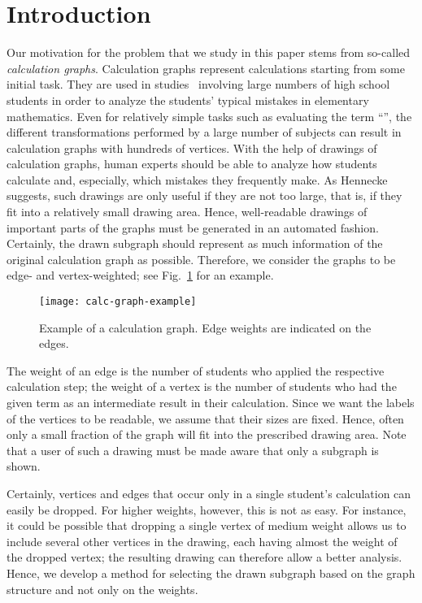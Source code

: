 \documentclass[]{llncs}
\begin{document}
\section{Introduction}
Our motivation for the problem that we study in this paper stems from
so-called \emph{calculation graphs}.  Calculation graphs
represent calculations starting from some initial task.  They
are used in studies~\cite{hennecke07} involving large numbers of high school
students in order to analyze the students' typical mistakes in elementary
mathematics. Even for relatively simple tasks such as evaluating the
term ``'', the different transformations
performed by a large number of subjects can result in calculation
graphs with hundreds of vertices. With the help of drawings of
calculation graphs, human experts should be able to analyze how
students calculate and, especially, which mistakes they frequently
make. As Hennecke~\cite{hennecke07} suggests, such drawings
are only useful if they are not too large, that is, if
they fit into a relatively small drawing area. Hence, well-readable
drawings of important parts of the graphs must be generated in an
automated fashion. 
Certainly, the drawn subgraph should represent as much information
of the original calculation graph as possible. 
Therefore, we consider the graphs to be edge- and
vertex-weighted; see Fig.~\ref{fig:calc-graph-example} for an
example.
\begin{figure}[h]
	\centering
	\texttt{[image: calc-graph-example]}
	\caption{Example of a calculation graph. Edge weights are indicated
	on the edges.}
	\label{fig:calc-graph-example}
\end{figure}
The weight of an edge is the number of students who
applied the respective calculation step; the weight of a vertex is the
number of students who had the given term as an intermediate result in
their calculation.
Since we want the labels of the vertices to be readable, we assume
that their sizes are fixed.  Hence, often only a small fraction of the
graph will fit into the prescribed drawing area.
Note that a user of such a drawing must be made aware that
only a subgraph is shown.

Certainly, vertices and edges that occur
only in a single student's calculation can easily be dropped. For
higher weights, however, this is not as easy. For instance, it could
be possible that dropping a single vertex of medium weight allows us
to include several other vertices in the drawing, each having almost
the weight of the dropped vertex; the resulting drawing can therefore
allow a better analysis. Hence, we develop a method for
selecting the drawn subgraph based on the graph structure and not only
on the weights.
\end{document}
